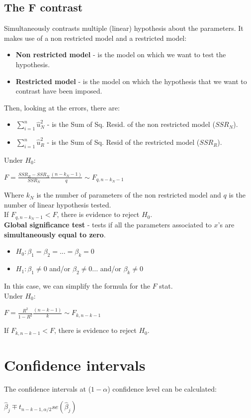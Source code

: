 \documentclass[10pt, a4paper, landscape]{extarticle}
\begin{document}
\begin{multicols}{3}
	\subsection*{The F contrast}
		Simultaneously contrasts multiple (linear) hypothesis about the parameters. It makes use of a non restricted model and a restricted model:
		\begin{itemize}[leftmargin=*]
			\item \textbf{Non restricted model} - is the model on which we want to test the hypothesis.
			\item \textbf{Restricted model} - is the model on which the hypothesis that we want to contrast have been imposed.
		\end{itemize}
		Then, looking at the errors, there are:
		\begin{itemize}[leftmargin=*]
			\item \textbf{$\sum_{i=1}^n \hat{u}_{N}^2$} - is the Sum of Sq. Resid. of the non restricted model ($SSR_{N}$).
			\item \textbf{$\sum_{i=1}^n \hat{u}_R^2$} - is the Sum of Sq. Resid of the restricted model ($SSR_R$).
		\end{itemize}
		Under $H_0$:
		\begin{center}
			$F = \frac{SSR_R - SSR_{N}}{SSR_{N}} \frac{(n-k_{N}-1)}{q} \sim F_{q, n-k_{N}-1}$
		\end{center}
		Where $k_{N}$ is the number of parameters of the non restricted model and $q$ is the number of linear hypothesis tested.
		\\ If $F_{q, n-k_{N}-1} < F$, there is evidence to reject $H_0$.
		\\ \textbf{Global significance test} - tests if all the parameters associated to $x$'s are \textbf{simultaneously equal to zero}.
		\begin{itemize}[leftmargin=*]
			\item $H_0: \beta_1 = \beta_2 = ... = \beta_k = 0$
			\item $H_1: \beta_1 \neq 0$ and/or $\beta_2 \neq 0 ...$ and/or $\beta_k \neq 0$
		\end{itemize}
		In this case, we can simplify the formula for the $F$ stat.
		\\ Under $H_0$:
		\begin{center}
			$F = \frac{R^2}{1 - R^2} \frac{(n-k-1)}{k} \sim F_{k, n-k-1}$
		\end{center}
		If $F_{k, n-k-1} < F$, there is evidence to reject $H_0$.

\section*{Confidence intervals}
	The confidence intervals at ($1 - \alpha$) confidence level can be calculated:
	\begin{center}
		$\hat{\beta}_j \mp t_{n-k-1, \alpha/2} se(\hat{\beta}_j)$
	\end{center}


\end{multicols}
\end{document}
